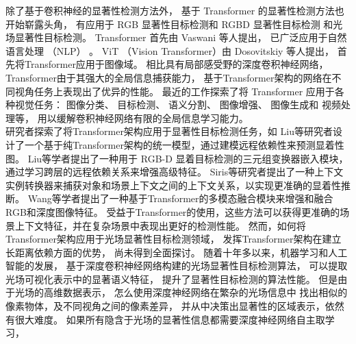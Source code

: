 除了基于卷积神经的显著性检测方法外，
基于 Transformer 的显著性检测方法也开始崭露头角，
有应用于 
RGB 显著性目标检测和 
RGBD 显著性目标检测
和光场显著性目标检测。
Transformer 首先由 Vaswani 等人提出，
已广泛应用于自然语言处理
（NLP）
。
ViT （Vision Transformer）由 Dosovitskiy 等人提出，
首先将Transformer应用于图像域。
相比具有局部感受野的深度卷积神经网络，
Transformer由于其强大的全局信息捕获能力，
基于Transformer架构的网络在不同视角任务上表现出了优异的性能。
最近的工作探索了将 Transformer 应用于各种视觉任务：
图像分类、
目标检测、
语义分割、
图像增强、
图像生成和 
视频处理等，
用以缓解卷积神经网络有限的全局信息学习能力。
\\
%
%
%
%
\indent
研究者探索了将Transformer架构应用于显著性目标检测任务，如
Liu等研究者设计了一个基于纯Transformer架构的统一模型，通过建模远程依赖性来预测显着性图。
Liu等学者提出了一种用于 RGB-D 显着目标检测的三元组变换器嵌入模块，通过学习跨层的远程依赖关系来增强高级特征。 
Siris等研究者提出了一种上下文实例转换器来捕获对象和场景上下文之间的上下文关系，以实现更准确的显着性推断。 
Wang等学者提出了一种基于Transformer的多模态融合模块来增强和融合RGB和深度图像特征。
受益于Transformer的使用，这些方法可以获得更准确的场景上下文特征，并在复杂场景中表现出更好的检测性能。 然而，如何将Transformer架构应用于光场显著性目标检测领域，
发挥Transformer架构在建立长距离依赖方面的优势，
尚未得到全面探讨。 
%
%
随着十年多以来，机器学习和人工智能的发展，
基于深度卷积神经网络构建的光场显著性目标检测算法，
可以提取光场可视化表示中的显著语义特征，
提升了显著性目标检测的算法性能。
但是由于光场的高维数据表示，
怎么使用深度神经网络在繁杂的光场信息中
找出相似的像素物体，及不同视角之间的像素差异，
并从中决策出显著性的区域表示，依然有很大难度。
如果所有隐含于光场的显著性信息都需要深度神经网络自主取学习，
